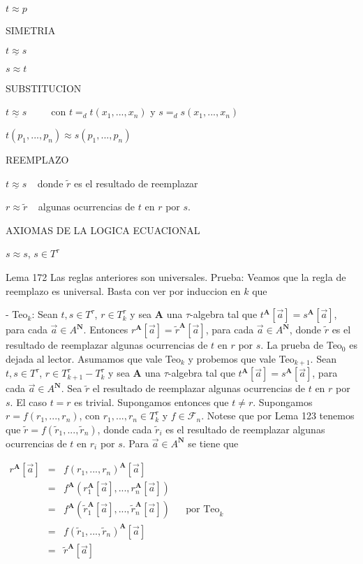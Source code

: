 \(t\approx p\)

SIMETRIA

\(\underline{t\approx s}\)

\(s\approx t\)

SUBSTITUCION

\(\underline{t\approx s}\;\;\;\;\;\;\;\;\;\)con \(t=_{d}t(x_{1},...,x_{n})\) y \( s=_{d}s(x_{1},...,x_{n})\)

\(t(p_1,...,p_n)\approx s(p_1,...,p_n)\)

REEMPLAZO

\(\underline{t\approx s}\;\;\;\;\)donde \(\tilde r\) es el resultado de reemplazar

\(r\approx \tilde r\;\;\;\;\)algunas ocurrencias de \(t\) en \(r\) por \(s.\)

AXIOMAS DE LA LOGICA ECUACIONAL

\(s\approx s\), \(s\in T^{\tau }\)

Lema 172 Las reglas anteriores son universales.
Prueba: Veamos que la regla de reemplazo es universal. Basta con ver por induccion en \(k\) que

- Teo\(_{k}\): Sean \(t,s\in T^{\tau }\), \(r\in T_{k}^{\tau }\) y sea \( \mathbf{A}\) una \(\tau \)-algebra tal que \(t^{\mathbf{A}}[\vec{a}]=s^{\mathbf{A }}[\vec{a}]\), para cada \(\vec{a}\in A^{\mathbf{N}}\). Entonces \(r^{\mathbf{A} }[\vec{a}]=\tilde{r}^{\mathbf{A}}[\vec{a}]\), para cada \(\vec{a}\in A^{ \mathbf{N}}\), donde \(\tilde{r}\) es el resultado de reemplazar algunas ocurrencias de \(t\) en \(r\) por \(s.\)
La prueba de Teo\(_{0}\) es dejada al lector. Asumamos que vale Teo\(_{k}\) y probemos que vale Teo\(_{k+1}\). Sean \(t,s\in T^{\tau }\), \(r\in T_{k+1}^{\tau }-T_{k}^{\tau }\) y sea \(\mathbf{A}\) una \(\tau \)-algebra tal que \(t^{\mathbf{A }}[\vec{a}]=s^{\mathbf{A}}[\vec{a}]\), para cada \(\vec{a}\in A^{\mathbf{N}}\). Sea \(\tilde{r}\) el resultado de reemplazar algunas ocurrencias de \(t\) en \(r\) por \(s\). El caso \(t=r\) es trivial. Supongamos entonces que \(t\neq r\). Supongamos \(r=f(r_{1},...,r_{n})\), con \(r_{1},...,r_{n}\in T_{k}^{\tau }\) y \( f\in \mathcal{F}_{n}\). Notese que por Lema 123 tenemos que \(\tilde{r}=f(\tilde{r}_{1},...,\tilde{r}_{n})\), donde cada \(\tilde{r} _{i} \) es el resultado de reemplazar algunas ocurrencias de \(t\) en \(r_{i}\) por \(s\). Para \(\vec{a}\in A^{\mathbf{N}}\) se tiene que

\(\displaystyle \begin{array}{cclll} r^{\mathbf{A}}[\vec{a}] & = & f(r_{1},...,r_{n})^{\mathbf{A}}[\vec{a}] & & \\ & = & f^{\mathbf{A}}(r_{1}^{\mathbf{A}}[\vec{a}],...,r_{n}^{\mathbf{A}}[\vec{ a}]) & & \\ & = & f^{\mathbf{A}}(\tilde{r}_{1}^{\mathbf{A}}[\vec{a}],...,\tilde{r}_{n}^{ \mathbf{A}}[\vec{a}]) & & \text{por Teo}_{k} \\ & = & f(\tilde{r}_{1},...,\tilde{r}_{n})^{\mathbf{A}}[\vec{a}] & & \\ & = & \tilde{r}^{\mathbf{A}}[\vec{a}] & & \end{array} \)

